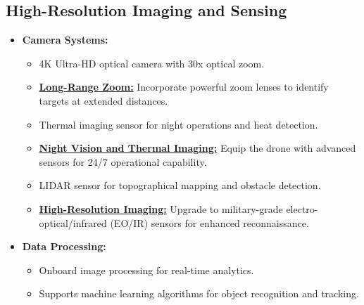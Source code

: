 \documentclass{article}
\begin{document}
\subsection{High-Resolution Imaging and Sensing}
\begin{itemize}
    \item \textbf{Camera Systems:}
    \begin{itemize}
        \item 4K Ultra-HD optical camera with 30x optical zoom.
        \item \textbf{\underline{Long-Range Zoom:}} Incorporate powerful zoom lenses to identify targets at extended distances.
        \item Thermal imaging sensor for night operations and heat detection.
        \item \textbf{\underline{Night Vision and Thermal Imaging:}} Equip the drone with advanced sensors for 24/7 operational capability.
        \item LIDAR sensor for topographical mapping and obstacle detection.
        \item \textbf{\underline{High-Resolution Imaging:}} Upgrade to military-grade electro-optical/infrared (EO/IR) \linebreak sensors for enhanced reconnaissance.
    \end{itemize}
    \item \textbf{Data Processing:}
    \begin{itemize}
        \item Onboard image processing for real-time analytics.
        \item Supports machine learning algorithms for object recognition and tracking.
    \end{itemize}
\end{itemize}
\end{document}
